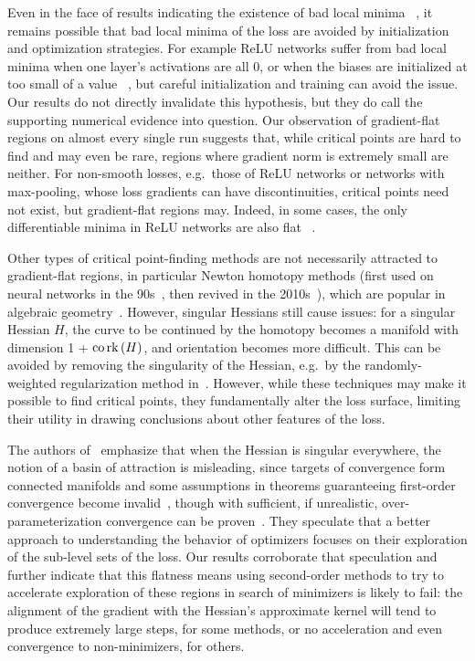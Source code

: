 \documentclass[../../thesis.tex]{subfiles}
\begin{document}
Even in the face of results indicating the existence of bad local minima%
~\cite{ding2019},
it remains possible that bad local minima of the loss
are avoided by initialization and optimization strategies.
For example ReLU networks suffer from bad local minima
when one layer's activations are all $0$,
or when the biases are initialized at too small of a value%
~\cite{holzmller2020},
but careful initialization and training can avoid the issue.
Our results do not directly invalidate
this hypothesis,
but they do call the supporting numerical evidence into question.
Our observation of gradient-flat regions on almost every single run
suggests that, while critical points are hard to find
and may even be rare,
regions where gradient norm is extremely small are neither.
For non-smooth losses,
e.g.~those of ReLU networks or networks with max-pooling,
whose loss gradients can have discontinuities,
critical points need not exist,
but gradient-flat regions may.
Indeed, in some cases, the only differentiable minima
in ReLU networks are also flat%
~\cite{laurent2017}.

Other types of critical point-finding methods are not necessarily
attracted to gradient-flat regions, in particular Newton homotopy methods
(first used on neural networks in the 90s~\cite{coetzee1997},
then revived in the 2010s~\cite{ballard2017,mehta2018b}),
which are popular in algebraic geometry~\cite{bates2013}.
However, singular Hessians still cause issues:
for a singular Hessian $H$, the curve to be continued by the homotopy
becomes a manifold with dimension 1 + $\operatorname*{co}\operatorname*{rk}\left(H\right)$,
and orientation becomes more difficult.
This can be avoided by removing the singularity of the Hessian,
e.g.~by the randomly-weighted regularization method in~\cite{mehta2018a}.
However, while these techniques may make it possible to find
critical points,
they fundamentally alter the loss surface,
limiting their utility in drawing conclusions about other features
of the loss.

The authors of~\cite{sagun2017} emphasize that
when the Hessian is singular everywhere,
the notion of a basin of attraction is misleading,
since targets of convergence form
connected manifolds
and some assumptions in theorems guaranteeing first-order convergence
become invalid~\cite{jin2018a},
though with sufficient, if unrealistic, over-parameterization
convergence can be proven~\cite{du2018}.
They speculate that a better approach
to understanding the behavior of optimizers
focuses on their exploration of the sub-level sets of the loss.
Our results corroborate that speculation and
further indicate that this flatness means using second-order methods
to try to accelerate exploration of these regions
in search of minimizers
is likely to fail:
the alignment of the gradient with the Hessian's approximate kernel
will tend to produce extremely large steps, for some methods,
or no acceleration and even convergence to non-minimizers,
for others.
\end{document}
